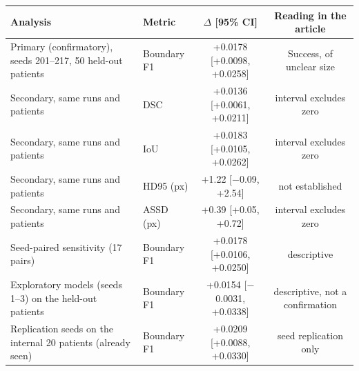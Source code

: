 \begin{tabular}{llcc}
\toprule
Analysis & Metric & $\Delta$ [95\% CI] & Reading in the article \\
\midrule
Primary (confirmatory), seeds 201--217, 50 held-out patients & Boundary F1 & +0.0178 [+0.0098, +0.0258] & Success, of unclear size \\
\addlinespace
Secondary, same runs and patients & DSC & +0.0136 [+0.0061, +0.0211] & interval excludes zero \\
Secondary, same runs and patients & IoU & +0.0183 [+0.0105, +0.0262] & interval excludes zero \\
Secondary, same runs and patients & HD95 (px) & +1.22 [$-$0.09, +2.54] & not established \\
Secondary, same runs and patients & ASSD (px) & +0.39 [+0.05, +0.72] & interval excludes zero \\
\addlinespace
Seed-paired sensitivity (17 pairs) & Boundary F1 & +0.0178 [+0.0106, +0.0250] & descriptive \\
Exploratory models (seeds 1--3) on the held-out patients & Boundary F1 & +0.0154 [$-$0.0031, +0.0338] & descriptive, not a confirmation \\
Replication seeds on the internal 20 patients (already seen) & Boundary F1 & +0.0209 [+0.0088, +0.0330] & seed replication only \\
\bottomrule
\end{tabular}
